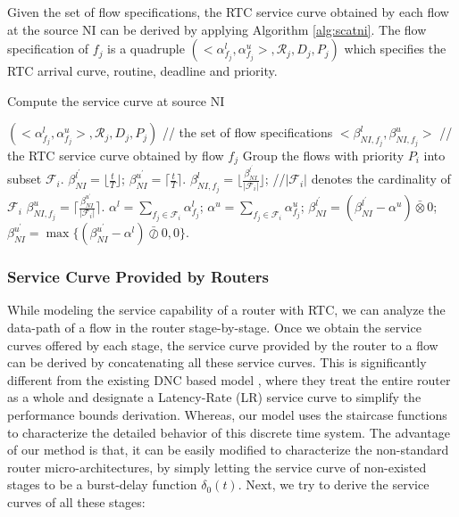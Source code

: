 \documentclass[preprint]{elsarticle}
\begin{document}
Given the set of flow specifications, the RTC service curve obtained by each flow at the source NI can be derived by applying Algorithm \ref{alg:scatni}. The flow specification of $f_j$ is a quadruple $(<\alpha^l_{f_j},\alpha^u_{f_j}>,\mathcal{R}_j,D_j,P_j)$ which specifies the RTC arrival curve, routine, deadline and priority.
\begin{algorithm}
\caption{Compute the service curve at source NI}\label{alg:scatni}
\begin{algorithmic}[1]
\Require $(<\alpha^l_{f_j},\alpha^u_{f_j}>,\mathcal{R}_j,D_j,P_j)$ // the set of flow specifications
\Ensure $<\beta_{NI,f_j}^l,\beta_{NI,f_j}^u>$ // the RTC service curve obtained by flow $f_j$
\State Group the flows with priority $P_i$ into subset $\mathcal{F}_i$.
\State $\beta_{NI}^{l^\prime}=\lfloor\frac{t}{T}\rfloor$; $\beta_{NI}^{u^\prime}=\lceil\frac{t}{T}\rceil$.
        \State $\beta_{NI,f_j}^l=\lfloor\frac{\beta_{NI}^{l^\prime}}{|\mathcal{F}_i|}\rfloor$; //$|\mathcal{F}_i|$ denotes the cardinality of $\mathcal{F}_i$
        \State $\beta_{NI,f_j}^u=\lceil\frac{\beta_{NI}^{u^\prime}}{|\mathcal{F}_i|}\rceil$.
    \EndFor
    \State $\alpha^l=\sum_{f_j\in \mathcal{F}_i}\alpha^l_{f_j}$; $\alpha^u=\sum_{f_j\in \mathcal{F}_i}\alpha^u_{f_j}$;
    \State $\beta_{NI}^{l^\prime}=(\beta_{NI}^{l^\prime}-\alpha^u)\bar{\otimes}0$; $\beta_{NI}^{u^\prime}=\max\{(\beta_{NI}^{u^\prime}-\alpha^l)\bar{\oslash}0,0\}$.
\EndFor
\end{algorithmic}
\end{algorithm}

\subsubsection{Service Curve Provided by Routers}\label{router}
While modeling the service capability of a router with RTC, we can analyze the data-path of a flow in the router stage-by-stage. Once we obtain the service curves offered by each stage, the service curve provided by the router to a flow can be derived by concatenating all these service curves. This is significantly different from the existing DNC based model \cite{qian2009analysis,Qian489900}, where they treat the entire router as a whole and designate a Latency-Rate (LR) service curve \cite{Boudec2001Network} to simplify the performance bounds derivation. Whereas, our model uses the staircase functions to characterize the detailed behavior of this discrete time system. The advantage of our method is that, it can be easily modified to characterize the non-standard router micro-architectures, by simply letting the service curve of non-existed stages to be a burst-delay function $\delta_0(t)$. Next, we try to derive the service curves of all these stages:
\end{document}
